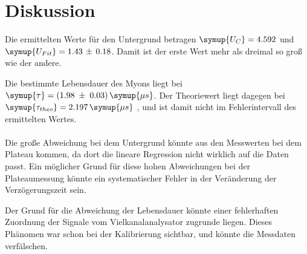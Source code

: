 \section{Diskussion}
\label{sec:Diskussion}

Die ermittelten Werte für den Untergrund betragen $\symup{U_{C}} = 4.592$ und
$\symup{U_{Fit}} = 1.43\,\pm\,0.18$. Damit ist der erste Wert mehr als dreimal so
groß wie der andere.

Die bestimmte Lebensdauer des Myons liegt bei $\symup{\tau} = (1.98\;\pm\;0.03)\,\symup{\mu s}$.
Der Theoriewert liegt dagegen bei $\symup{\tau_{theo}} = 2.197\,\symup{\mu s}$ \cite{pdg}, und ist
damit nicht im Fehlerintervall des ermittelten Wertes.\\
\ \\
\noindent
Die große Abweichung bei dem Untergrund könnte aus den Messwerten bei dem Plateau kommen, da
dort die lineare Regression nicht wirklich auf die Daten passt. Ein möglicher Grund für diese
hohen Abweichungen bei der Plateaumessung könnte ein systematischer Fehler in der Veränderung
der Verzögerungszeit sein.

Der Grund für die Abweichung der Lebensdauer könnte einer fehlerhaften Zuordnung der Signale
vom Vielkanalanalysator zugrunde liegen. Dieses Phänomen war schon bei der Kalibrierung sichtbar,
und könnte die Messdaten verfälschen.
